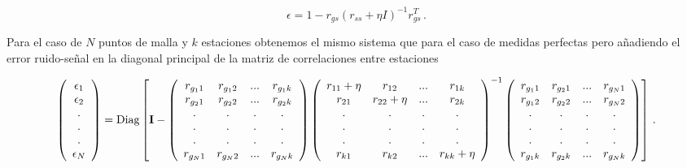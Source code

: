 \documentclass[
]{agujournal2019}
\begin{document}
\[\epsilon=1-r_{gs}(r_{ss}+\eta I)^{-1}r^T_{gs}\,.\]

Para el caso de \(N\) puntos de malla y \(k\) estaciones obtenemos el
mismo sistema que para el caso de medidas perfectas pero añadiendo el
error ruido-señal en la diagonal principal de la matriz de correlaciones
entre estaciones

\begingroup\makeatletter{}\check@mathfonts

\[\left(\begin{array}{ccc}
  \epsilon_{1} \\
  \epsilon_{2} \\
  . \\
  . \\
  . \\
  \epsilon_{N} \\
     \end{array}\right)=\text{Diag}\left[
     {\textbf I}-
\left(\begin{array}{ccccc}
  r_{g_11} & r_{g_12} &... &  r_{g_1k}\\
  r_{g_21} & r_{g_22} &... &  r_{g_2k}\\
  . & . & . & . \\
  . & . & . & . \\
  . & . & . & . \\
  r_{g_N1} & r_{g_N2} & ... & r_{g_Nk}\\
     \end{array}\right)
 \left(\begin{array}{ccccc}
  r_{11}+\eta & r_{12} &... &  r_{1k}\\
  r_{21} & r_{22}+\eta &... &  r_{2k}\\
  . & . & . & . \\
  . & . & . & . \\
  . & . & . & . \\
  r_{k1} & r_{k2} & ... & r_{kk}+\eta\\
     \end{array}\right)^{-1}
\left(\begin{array}{ccccc}
  r_{g_11} & r_{g_21} &... &  r_{g_N1}\\
  r_{g_12} & r_{g_22} &... &  r_{g_N2}\\
  . & . & . & . \\
  . & . & . & . \\
  . & . & . & . \\
  r_{g_1k} & r_{g_2k} & ... & r_{g_Nk}\\
     \end{array}\right) \right]
     \,.\]\endgroup 
\end{document}
